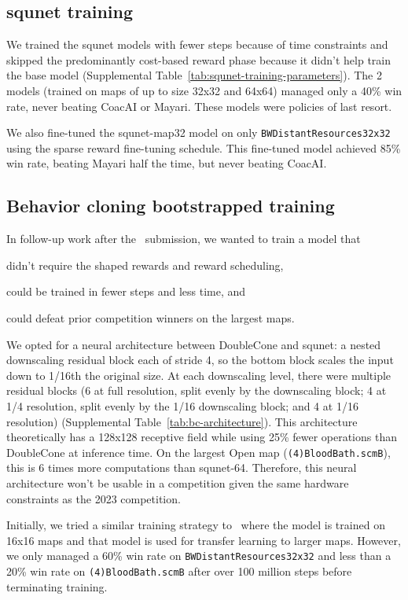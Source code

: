 \documentclass[conference]{IEEEtran}
\begin{document}
\subsection{squnet training}
We trained the squnet models with fewer steps because of time constraints and skipped the
predominantly cost-based reward phase because it didn't help train the
base model (Supplemental Table~\ref{tab:squnet-training-parameters}). The 2 models (trained on maps of
up to size 32x32 and 64x64) managed only a 40\% win rate, never beating CoacAI or Mayari. 
These models were policies of last resort.

We also fine-tuned the squnet-map32 model on only \texttt{BWDistantResources32x32}
using the sparse reward fine-tuning schedule. This fine-tuned 
model achieved 85\% win rate, beating Mayari half the time, but never beating CoacAI.

\subsection{Behavior cloning bootstrapped training}
In follow-up work after the \agentName\ submission, we wanted to train a model that
\begin{inparaenum}[(1)]
    \item didn't require the shaped rewards and reward scheduling,
    \item could be trained in fewer steps and less time, and
    \item could defeat prior competition winners on the largest maps.
\end{inparaenum}
We opted for a neural architecture between DoubleCone and squnet: a nested downscaling residual
block each of stride 4, so the bottom block scales the input down to 1/16th the original
size. At each downscaling level, there were multiple residual blocks (6 at full
resolution, split evenly by the downscaling block; 4 at 1/4 resolution, split evenly by
the 1/16 downscaling block; and 4 at 1/16 resolution) (Supplemental Table~\ref{tab:bc-architecture}). This architecture theoretically
has a 128x128 receptive field while using 25\% fewer operations than DoubleCone at inference time. On
the largest Open map (\texttt{(4)BloodBath.scmB}), this is 6 times more
computations than squnet-64. Therefore, this neural architecture won't be usable in a
competition given the same hardware constraints as the 2023 competition.

Initially, we tried a similar training strategy to \agentName\ where the model is
trained on 16x16 maps and that model is used for transfer learning to
larger maps. However, we only managed a 60\% win rate on
\texttt{BWDistantResources32x32} and less than a 20\% win rate on
\texttt{(4)BloodBath.scmB} after over 100 million
steps before terminating training.
\end{document}
